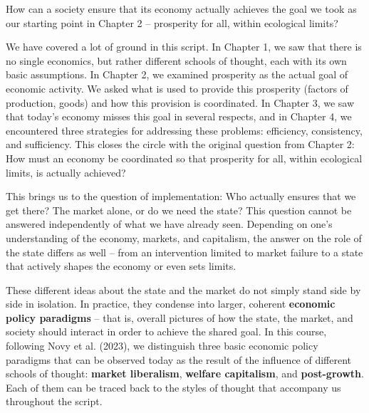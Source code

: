 \documentclass[
  british,
  a4paper,
  DIV=11,
  numbers=noendperiod,
  oneside,
  openany]{scrreprt}
\begin{document}
\begin{tcolorbox}[enhanced jigsaw, arc=.35mm, bottomrule=.15mm, bottomtitle=1mm, breakable, colback=white, colbacktitle=quarto-callout-note-color!10!white, colframe=quarto-callout-note-color-frame, coltitle=black, left=2mm, leftrule=.75mm, opacityback=0, opacitybacktitle=0.6, rightrule=.15mm, title={Guiding question}, titlerule=0mm, toprule=.15mm, toptitle=1mm]

How can a society ensure that its economy actually achieves the goal we
took as our starting point in Chapter 2 -- prosperity for all, within
ecological limits?

\end{tcolorbox}

We have covered a lot of ground in this script. In Chapter 1, we saw
that there is no single economics, but rather different schools of
thought, each with its own basic assumptions. In Chapter 2, we examined
prosperity as the actual goal of economic activity. We asked what is
used to provide this prosperity (factors of production, goods) and how
this provision is coordinated. In Chapter 3, we saw that today's economy
misses this goal in several respects, and in Chapter 4, we encountered
three strategies for addressing these problems: efficiency, consistency,
and sufficiency. This closes the circle with the original question from
Chapter 2: How must an economy be coordinated so that prosperity for
all, within ecological limits, is actually achieved?

This brings us to the question of implementation: Who actually ensures
that we get there? The market alone, or do we need the state? This
question cannot be answered independently of what we have already seen.
Depending on one's understanding of the economy, markets, and
capitalism, the answer on the role of the state differs as well -- from
an intervention limited to market failure to a state that actively
shapes the economy or even sets limits.

These different ideas about the state and the market do not simply stand
side by side in isolation. In practice, they condense into larger,
coherent \textbf{economic policy paradigms} -- that is, overall pictures
of how the state, the market, and society should interact in order to
achieve the shared goal. In this course, following Novy et al. (2023),
we distinguish three basic economic policy paradigms that can be
observed today as the result of the influence of different schools of
thought: \textbf{market liberalism}, \textbf{welfare capitalism}, and
\textbf{post-growth}. Each of them can be traced back to the styles of
thought that accompany us throughout the script.
\end{document}
